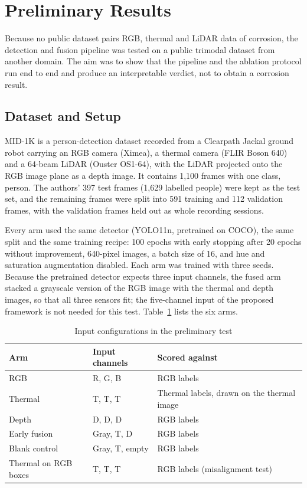 \section{Preliminary Results}
\label{sec:preliminary-results}

Because no public dataset pairs RGB, thermal and LiDAR data of corrosion, the
detection and fusion pipeline was tested on a public trimodal dataset from
another domain. The aim was to show that the pipeline and the ablation protocol
run end to end and produce an interpretable verdict, not to obtain a corrosion
result.

\subsection{Dataset and Setup}

MID-1K \citep{Mota2024} is a person-detection dataset recorded from a Clearpath
Jackal ground robot carrying an RGB camera (Ximea), a thermal camera (FLIR Boson
640) and a 64-beam LiDAR (Ouster OS1-64), with the LiDAR projected onto the RGB
image plane as a depth image. It contains 1,100 frames with one class, person.
The authors' 397 test frames (1,629 labelled people) were kept as the test set,
and the remaining frames were split into 591 training and 112 validation frames,
with the validation frames held out as whole recording sessions.

Every arm used the same detector (YOLO11n, pretrained on COCO), the same split
and the same training recipe: 100 epochs with early stopping after 20 epochs
without improvement, 640-pixel images, a batch size of 16, and hue and
saturation augmentation disabled. Each arm was trained with three seeds. Because
the pretrained detector expects three input channels, the fused arm stacked a
grayscale version of the RGB image with the thermal and depth images, so that
all three sensors fit; the five-channel input of the proposed framework is not
needed for this test. Table~\ref{tab:prelim-arms} lists the six arms.

\begin{table}[htbp]
\centering
\caption{Input configurations in the preliminary test}
\label{tab:prelim-arms}
\small
\renewcommand{\arraystretch}{1.2}
\begin{tabularx}{\textwidth}{@{}l>{\RaggedRight\arraybackslash}p{4.2cm}>{\RaggedRight\arraybackslash}X@{}}
\toprule
\textbf{Arm} & \textbf{Input channels} & \textbf{Scored against} \\
\midrule
RGB & R, G, B & RGB labels \\
Thermal & T, T, T & Thermal labels, drawn on the thermal image \\
Depth & D, D, D & RGB labels \\
Early fusion & Gray, T, D & RGB labels \\
Blank control & Gray, T, empty & RGB labels \\
Thermal on RGB boxes & T, T, T & RGB labels (misalignment test) \\
\bottomrule
\end{tabularx}
\end{table}

